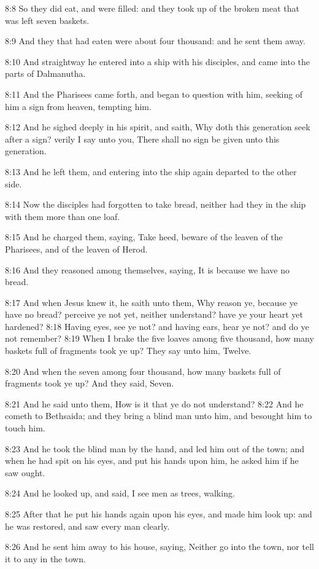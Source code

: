 8:8 So they did eat, and were filled: and they took up of the broken
meat that was left seven baskets.

8:9 And they that had eaten were about four thousand: and he sent them
away.

8:10 And straightway he entered into a ship with his disciples, and
came into the parts of Dalmanutha.

8:11 And the Pharisees came forth, and began to question with him,
seeking of him a sign from heaven, tempting him.

8:12 And he sighed deeply in his spirit, and saith, Why doth this
generation seek after a sign? verily I say unto you, There shall no
sign be given unto this generation.

8:13 And he left them, and entering into the ship again departed to
the other side.

8:14 Now the disciples had forgotten to take bread, neither had they
in the ship with them more than one loaf.

8:15 And he charged them, saying, Take heed, beware of the leaven of
the Pharisees, and of the leaven of Herod.

8:16 And they reasoned among themselves, saying, It is because we have
no bread.

8:17 And when Jesus knew it, he saith unto them, Why reason ye,
because ye have no bread? perceive ye not yet, neither understand?
have ye your heart yet hardened?  8:18 Having eyes, see ye not? and
having ears, hear ye not? and do ye not remember?  8:19 When I brake
the five loaves among five thousand, how many baskets full of
fragments took ye up? They say unto him, Twelve.

8:20 And when the seven among four thousand, how many baskets full of
fragments took ye up? And they said, Seven.

8:21 And he said unto them, How is it that ye do not understand?  8:22
And he cometh to Bethsaida; and they bring a blind man unto him, and
besought him to touch him.

8:23 And he took the blind man by the hand, and led him out of the
town; and when he had spit on his eyes, and put his hands upon him, he
asked him if he saw ought.

8:24 And he looked up, and said, I see men as trees, walking.

8:25 After that he put his hands again upon his eyes, and made him
look up: and he was restored, and saw every man clearly.

8:26 And he sent him away to his house, saying, Neither go into the
town, nor tell it to any in the town.

